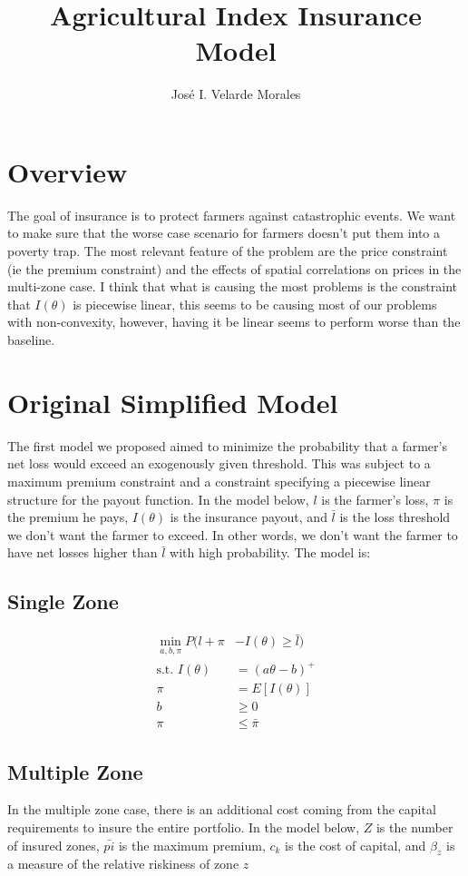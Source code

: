 \documentclass[11pt]{article}
\title{Agricultural Index Insurance Model}
\author{José I. Velarde Morales}
\begin{document}
\maketitle

\section{Overview}
The goal of insurance is to protect farmers against catastrophic events. We want to make sure that the worse case scenario for farmers doesn't put them into a poverty trap. The most relevant feature of the problem are the price constraint (ie the premium constraint) and the effects of spatial correlations on prices in the multi-zone case. I think that what is causing the most problems is the constraint that $I(\theta)$ is piecewise linear, this seems to be causing most of our problems with non-convexity, however, having it be linear seems to perform worse than the baseline. 

\section{Original Simplified Model}

The first model we proposed aimed to minimize the probability that a farmer's net loss would exceed an exogenously given threshold. This was subject to a maximum premium constraint and a constraint specifying a piecewise linear structure for the payout function. In the model below, $l$ is the farmer's loss, $\pi$ is the premium he pays, $I(\theta)$ is the insurance payout, and $\bar{l}$ is the loss threshold we don't want the farmer to exceed. In other words, we don't want the farmer to have net losses higher than $\bar{l}$ with high probability. The model is:

\subsection*{Single Zone}

\begin{align}
    \min_{a,b,\pi} P(l + \pi &-I(\theta) \geq \bar{l})\\
    \text{s.t.   } I(\theta) &= (a\theta - b)^+\\
    \pi &= E[I(\theta)]\\
    b &\geq 0\\
    \pi &\leq \bar{\pi}
\end{align}

\subsection*{Multiple Zone}
In the multiple zone case, there is an additional cost coming from the capital requirements to insure the entire portfolio. In the model below, $Z$ is the number of insured zones, $\bar{pi}$ is the maximum premium, $c_k$ is the cost of capital, and $\beta_z$ is a measure of the relative riskiness of zone $z$
\end{document}
